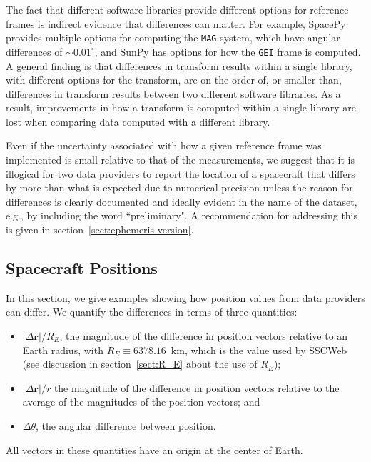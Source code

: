 \documentclass[draft]{agujournal2019}
\begin{document}
The fact that different software libraries provide different options for reference frames is indirect evidence that differences can matter. For example, SpacePy \cite{SpacePy} provides multiple options for computing the \texttt{MAG} system, which have angular differences of ${\sim}0.01^\circ$, and SunPy \cite{SunPy} has options for how the \texttt{GEI} frame is computed. A general finding is that differences in transform results within a single library, with different options for the transform, are on the order of, or smaller than, differences in transform results between two different software libraries. As a result, improvements in how a transform is computed within a single library are lost when comparing data computed with a different library. 

Even if the uncertainty associated with how a given reference frame was implemented is small relative to that of the measurements, we suggest that it is illogical for two data providers to report the location of a spacecraft that differs by more than what is expected due to numerical precision unless the reason for differences is clearly documented and ideally evident in the name of the dataset, e.g., by including the word ``preliminary". A recommendation for addressing this is given in section~\ref{sect:ephemeris-version}.

\subsection{Spacecraft Positions}
\label{sect:comparisons_ephemeris}

In this section, we give examples showing how position values from data providers can differ. We quantify the differences in terms of three quantities: 

\begin{itemize}
    \item $|\Delta\mathbf{r}|/R_E$, the magnitude of the difference in position vectors relative to an Earth radius, with $R_E\equiv 6378.16$~km, which is the value used by SSCWeb (see discussion in section~\ref{sect:R_E} about the use of $R_E$);
    \item $|\Delta\mathbf{r}|/\overline{r}$ the magnitude of the difference in position vectors relative to the average of the magnitudes of the position vectors; and
    \item  $\Delta \theta$, the angular difference between position.
\end{itemize}

All vectors in these quantities have an origin at the center of Earth. 
\end{document}
